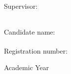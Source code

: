 \begin{titlepage}
\begin{center}
\vskip 2.5cm

\LARGE
	\textbf{\printtitle}

\vskip 4.5cm

\Large

\begin{minipage}[t]{7cm}
	Supervisor:\\
	\printsupervisor \\
\end{minipage}
\hfill
\begin{minipage}[t]{5cm}
	Candidate name:\\
	\printauthor\\
	Registration number:\\
    \regnumber
\end{minipage}

\vskip 1.5cm

	Academic Year \printacademicyear

\end{center}

\vfill
\eject
\end{titlepage}

\clearpage

\restoregeometry

